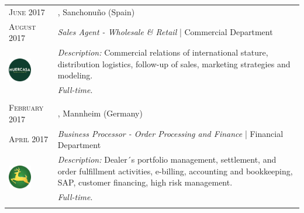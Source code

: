 %
%


\vspace{1.5 mm}

\begin{longtable}{R{2.5cm}|p{14.8cm}}

 	\textsc{June 2017} & \textsc{}, \faMapMarker \hspace{0.5 mm} Sanchonuño (Spain) \\
 	\textsc{August 2017} 	& \textit{Sales Agent - Wholesale \& Retail} | Commercial Department \\
	 & 
	\footnotesize{\faTasks \emph{ Description: }Commercial relations of international stature, distribution logistics, follow-up of sales, marketing strategies and modeling.} \\ &
	\footnotesize{\faFileText \emph{ Full-time}.} \\
 	 \\
 
 	\textsc{February 2017} & \textsc{}, \faMapMarker \hspace{0.5 mm} Mannheim (Germany) \\
 	\textsc{April 2017} 	& \textit{Business Processor - Order Processing and Finance} | Financial Department \\
	 & 
 	\footnotesize{\faTasks \emph{ Description: }Dealer´s portfolio management, settlement, and order fulfillment activities, e-billing, accounting and bookkeeping, SAP, customer financing, high risk management.} \\ &
	\footnotesize{\faFileText \emph{ Full-time}}. \\
 	 \\
	

\end{longtable}
